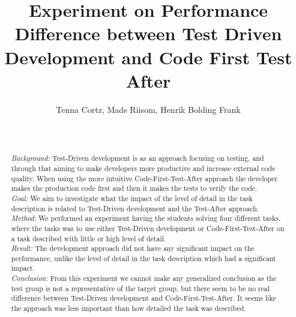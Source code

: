 \documentclass{sig-alternate-05-2015}
\begin{document}
	

\title{Experiment on Performance Difference between Test Driven Development and Code First Test After}

\author{
\alignauthor
Tenna Cortz, Mads Riisom, Henrik Bolding Frank\\
 \\
 \\
}


\maketitle
\begin{abstract}
 \textit{Background:} Test-Driven development is as an approach focusing on testing, and through that aiming to make developers more productive and increase external code quality. When using the more intuitive Code-First-Test-After approach the developer makes the production code first and then it makes the tests to verify the code.\\
[0.0em]
 \textit{Goal:} We aim to investigate what the impact of the level of detail in the task description is related to Test-Driven development and the Test-After approach.\\
[0.0em]
 \textit{Method:} We performed an experiment having the students solving four different tasks, where the tasks was to use either Test-Driven development or Code-First-Test-After on a task described with little or high level of detail.\\
[0.0em]
 \textit{Result:} The development approach did not have any significant impact on the performance,  unlike the level of detail in the task description which had a significant impact.\\
[0.0em]
 \textit{Conclusion:} From this experiment we cannot make any generalized conclusion as the test group is not a representative of the target group, but there seem to be no real difference between Test-Driven development and Code-First-Test-After. It seems like the approach was less important than how detailed the task was described.
\end{abstract}
\end{document}

